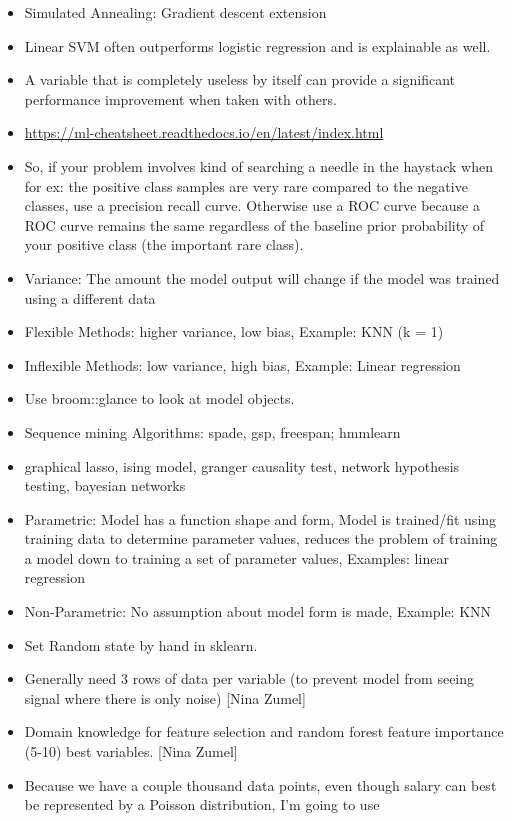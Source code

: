 \documentclass[]{book}
\theoremstyle{definition}
\theoremstyle{definition}
\theoremstyle{definition}
\theoremstyle{remark}
\begin{document}
\begin{itemize}
\item
  Simulated Annealing: Gradient descent extension
\item
  Linear SVM often outperforms logistic regression and is explainable as
  well.
\item
  A variable that is completely useless by itself can provide a
  significant performance improvement when taken with others.
\item
  \url{https://ml-cheatsheet.readthedocs.io/en/latest/index.html}
\item
  So, if your problem involves kind of searching a needle in the
  haystack when for ex: the positive class samples are very rare
  compared to the negative classes, use a precision recall curve.
  Otherwise use a ROC curve because a ROC curve remains the same
  regardless of the baseline prior probability of your positive class
  (the important rare class).
\item
  Variance: The amount the model output will change if the model was
  trained using a different data
\item
  Flexible Methods: higher variance, low bias, Example: KNN (k = 1)
\item
  Inflexible Methods: low variance, high bias, Example: Linear
  regression
\item
  Use broom::glance to look at model objects.
\item
  Sequence mining Algorithms: spade, gsp, freespan; hmmlearn
\item
  graphical lasso, ising model, granger causality test, network
  hypothesis testing, bayesian networks
\item
  Parametric: Model has a function shape and form, Model is trained/fit
  using training data to determine parameter values, reduces the problem
  of training a model down to training a set of parameter values,
  Examples: linear regression
\item
  Non-Parametric: No assumption about model form is made, Example: KNN
\item
  Set Random state by hand in sklearn.
\item
  Generally need 3 rows of data per variable (to prevent model from
  seeing signal where there is only noise) {[}Nina Zumel{]}
\item
  Domain knowledge for feature selection and random forest feature
  importance (5-10) best variables. {[}Nina Zumel{]}
\item
  Because we have a couple thousand data points, even though salary can
  best be represented by a Poisson distribution, I'm going to use

\end{itemize}
\end{document}
